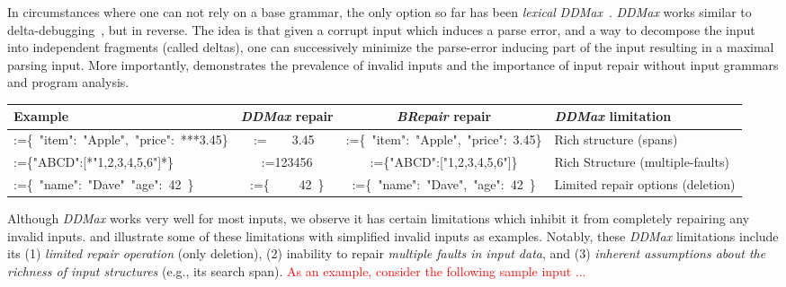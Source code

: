 \documentclass[sigconf,review,anonymous]{acmart}
\makeatletter
\newcounter{todocounter}
\newcommand{\todo}[1]{\marginpar{$|$}\textcolor{red}{\stepcounter{todocounter}\footnote[\thetodocounter]{\textcolor{red}{\textbf{TODO }}\textit{#1}}}}
\newcommand{\recheck}[1]{\textcolor{red}{#1}}
\renewcommand{\todo}[1]{}
\newcommand{\approach}{\textsc{BRepair}\xspace}
\newcommand{\ddmax}{\textit{DDMax}\xspace}
\newcommand{\brepair}{\textit{BRepair}\xspace}
\newcommand\letterboxed[1]{%
\setlength{\fboxsep}{0pt}%
  \@tfor\@ii:=#1\do{%
    \fcolorbox{white}{light-gray}{\texttt{\strut\@ii}}%
  }%
}
\makeatother
\begin{document}
In circumstances where one can not rely on a base grammar, the only option so far
has been \textit{lexical} \ddmax~\cite{kirschner2020debugging}. \ddmax works similar to
delta-debugging~\cite{zeller2002simplifying}, but in reverse. The idea
is that given a corrupt input which induces a parse error, and a way to
decompose the input into independent fragments (called deltas), one can
successively minimize the parse-error inducing part of the input resulting in a
maximal parsing input. 
More importantly, \citet{kirschner2020debugging} demonstrates the prevalence of invalid inputs and the importance of input repair without input grammars and program analysis.


\begin{table*}\centering
\footnotesize
\caption{\ddmax vs. \approach: examples showing limitations of \ddmax and the strengths of \approach}
\begin{tabular}{|l | c | c | l |}
\hline
Example & \ddmax repair & \brepair repair & \ddmax limitation \\
\hline
\letterboxed{\{\ "item":\ "Apple",\ "price":\ ***3.45\}} & \letterboxed{\ \ \ \
3.45\ } & \letterboxed{\{\ "item":\ "Apple",\ "price":\ 3.45\}} & Rich structure
(spans) \\
\letterboxed{\{"ABCD":[*"1,2,3,4,5,6"]*\}} & 
\letterboxed{123456} & 
\letterboxed{\{"ABCD":["1,2,3,4,5,6"]\}} & 
Rich Structure (multiple-faults) \\
\letterboxed{\{\ "name":\ "Dave"\ "age":\ 42\ \}} &
\letterboxed{\{ \ \ \ \ 42\ \}}  &
\letterboxed{\{\ "name":\ "Dave",\ "age":\ 42\ \}} &
Limited repair options (deletion) \\
\hline
\end{tabular}
\label{tab:ddmaxlimitations}
\end{table*}


Although \ddmax works very well for most inputs, %
we observe it %
has certain limitations which inhibit it from completely repairing any invalid inputs. %
\Cref{tab:ddmaxlimitations} and \Cref{motivation} illustrate some of these limitations with simplified invalid inputs as examples. 
Notably, these \ddmax limitations include its (1) \textit{limited repair operation} (only deletion), (2) inability to repair \textit{multiple faults in input data}, and (3)
\textit{inherent assumptions about the richness of input structures} (e.g., its search span).
\recheck{
As an example, consider the following sample input ...\todo{we need to decide the most important limitation to buttress with an example here ... I think one that requires insertion and incompleteness error-feedback is the most important differentiator, or a hybrid example that also contains multiple faults ... } \todo{it should also be the same example to motivate and illustrate the way \brepair works (after the par. )}
}
\end{document}
